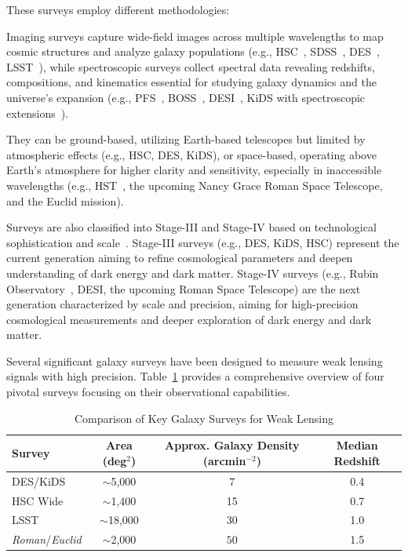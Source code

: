 \noindent These surveys employ different methodologies: 

Imaging surveys capture wide-field images across multiple wavelengths to map cosmic structures and analyze galaxy populations (e.g., HSC~\citep{2018PASJ...70S...4A}, SDSS~\citep{2019BAAS...51g.274K}, DES~\citep{2018ApJS..239...18A}, LSST~\citep{2019ApJ...873..111I}), while spectroscopic surveys collect spectral data revealing redshifts, compositions, and kinematics essential for studying galaxy dynamics and the universe's expansion (e.g., PFS~\citep{2016SPIE.9908E..1MT}, BOSS~\citep{2013AJ....145...10D}, DESI~\citep{2016arXiv161100036D}, KiDS with spectroscopic extensions~\citep{2013Msngr.154...44D}).

They can be ground-based, utilizing Earth-based telescopes but limited by atmospheric effects (e.g., HSC, DES, KiDS), or space-based, operating above Earth's atmosphere for higher clarity and sensitivity, especially in inaccessible wavelengths (e.g., HST~\citep{2001ApJ...553...47F}, the upcoming Nancy Grace Roman Space Telescope\citep{2015arXiv150303757S}, and the Euclid mission\citep{2010arXiv1001.0061R}).

Surveys are also classified into Stage-III and Stage-IV based on technological sophistication and scale~\citep{2006astro.ph..9591A}. Stage-III surveys (e.g., DES, KiDS, HSC) represent the current generation aiming to refine cosmological parameters and deepen understanding of dark energy and dark matter. Stage-IV surveys (e.g., Rubin Observatory~\citep{2019ApJ...873..111I}, DESI, the upcoming Roman Space Telescope) are the next generation characterized by scale and precision, aiming for high-precision cosmological measurements and deeper exploration of dark energy and dark matter.

Several significant galaxy surveys have been designed to measure weak lensing signals with high precision. Table~\ref{tab:survey_comparison} provides a comprehensive overview of four pivotal surveys focusing on their observational capabilities.
\begin{table}[h]
    \centering
    \caption{Comparison of Key Galaxy Surveys for Weak Lensing}
    \label{tab:survey_comparison}
    \begin{tabular}{lccc}
        \toprule
        \textbf{Survey} & \textbf{Area (deg$^2$)} & \textbf{Approx. Galaxy Density (arcmin$^{-2}$)} & \textbf{Median Redshift} \\
        \midrule
        DES/KiDS & $\sim$5,000 &  7 & 0.4 \\
        HSC Wide & $\sim$1,400 &  15 & 0.7 \\
        LSST & $\sim$18,000 & 30 & 1.0 \\
        \textit{Roman}/\textit{Euclid} & $\sim$2,000 & $50$ & 1.5 \\
        \bottomrule
    \end{tabular}
\end{table}

